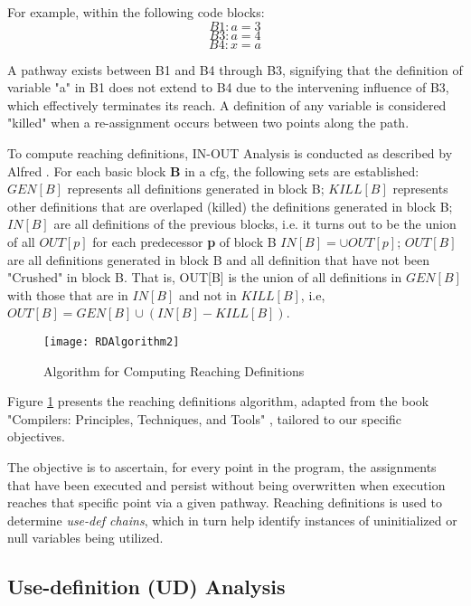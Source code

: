 For example, within the following code blocks:
\[B1: a=3\] 
\[B3: a=4\]
\[B4: x=a\]


A pathway exists between B1 and B4 through B3, signifying that the definition of variable "a" in B1 does not extend to B4 due to the intervening influence of B3, which effectively terminates its reach. A definition of any variable is considered "killed" when a re-assignment occurs between two points along the path.

To compute reaching definitions, IN-OUT Analysis is conducted as described by Alfred \cite{Alfred_V2007}. For each basic block \textbf{B} in a \gls{cfg}, the following sets are established: \(GEN[B]\) represents all definitions generated in block B; \(KILL[B]\) represents other definitions that are overlaped (killed) the definitions generated in block B; \(IN[B]\) are all definitions of the previous blocks, i.e. it turns out to be the union of all \(OUT[p]\) for each predecessor \textbf{p} of block B \(IN[B] = \cup OUT[p]\); \(OUT[B]\) are all definitions generated in block B and all definition that have not been "Crushed" in block B. That is, OUT[B] is the union of all definitions in \(GEN[B]\) with those that are in \(IN[B]\) and not in \(KILL[B]\), i.e, $ OUT[B] = GEN[B] \cup  \left(IN[B] - KILL[B]\right) $.


\begin{figure}[ht]
	\centering
	\texttt{[image: RDAlgorithm2]}
	  \caption{Algorithm for Computing Reaching Definitions}
  \label{fig:RD_algorithm}
\end{figure}

Figure \ref{fig:RD_algorithm} presents the reaching definitions algorithm, adapted from the book "Compilers: Principles, Techniques, and Tools" \cite{Alfred_V2007}, tailored to our specific objectives.

The objective is to ascertain, for every point in the program, the assignments that have been executed and persist without being overwritten when execution reaches that specific point via a given pathway. Reaching definitions is used to determine \textit{use-def chains}, which in turn help identify instances of uninitialized or null variables being utilized.


\subsection{Use-definition (UD) Analysis} %
\label{sec:Use_definition_Analysis}

